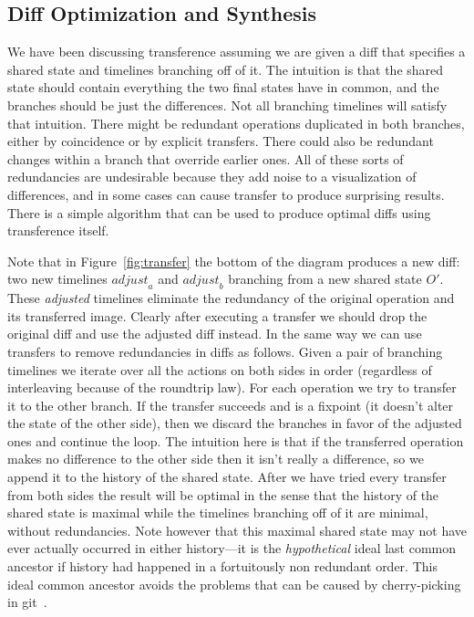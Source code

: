 \documentclass[english,submission]{programming}
\theoremstyle{definition}
\newcommand{\mathbox}[1]{\colorbox{black!10}{$#1$\phantom{i\hspace{-3.5pt}}}}
\begin{document}
\subsection{Diff Optimization and Synthesis}\label{diff-synth}

We have been discussing transference assuming we are given a diff that specifies a shared state and timelines branching off of it. The intuition is that the shared state should contain everything the two final states have in common, and the branches should be just the differences. Not all branching timelines will satisfy that intuition. There might be redundant operations duplicated in both branches, either by coincidence or by explicit transfers. There could also be redundant changes within a branch that override earlier ones. All of these sorts of redundancies are undesirable because they add noise to a visualization of differences, and in some cases can cause transfer to produce surprising results. There is a simple algorithm that can be used to produce optimal diffs using transference itself.

Note that in Figure~\ref{fig:transfer} the bottom of the diagram produces a new diff: two new timelines \mathbox{\mathit{adjust}_a} and \mathbox{\mathit{adjust}_b} branching from a new shared state \mathbox{O'}. These \textit{adjusted} timelines eliminate the redundancy of the original operation and its transferred image. Clearly after executing a transfer we should drop the original diff and use the adjusted diff instead. In the same way we can use transfers to remove redundancies in diffs as follows. Given a pair of branching timelines we iterate over all the actions on both sides in order (regardless of interleaving because of the roundtrip law). For each operation we try to transfer it to the other branch. If the transfer succeeds and is a fixpoint (it doesn't alter the state of the other side), then we discard the branches in favor of the adjusted ones and continue the loop. The intuition here is that if the transferred operation makes no difference to the other side then it isn't really a difference, so we append it to the history of the shared state. After we have tried every transfer from both sides the result will be optimal in the sense that the history of the shared state is maximal while the timelines branching off of it are minimal, without redundancies. Note however that this maximal shared state may not have ever actually occurred in either history---it is the \textit{hypothetical} ideal last common ancestor if history had happened in a fortuitously non redundant order. This ideal common ancestor avoids the problems that can be caused by cherry-picking in git~\cite{philomatics-git}.
\end{document}
